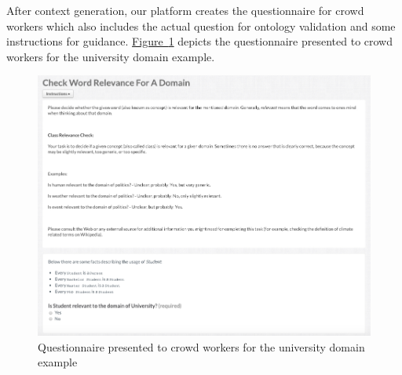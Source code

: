 After context generation, our platform creates the questionnaire for crowd workers which also includes the actual question for ontology validation and some instructions for guidance. 
\hyperref[fig:university_ontology_questionaire]{Figure~\ref*{fig:university_ontology_questionaire}} depicts the questionnaire presented to crowd workers for the university domain example. 
\begin{figure}
	 \centering
	 \includegraphics[width=\textwidth]{screenshots/questionaire_university_example}
	 \caption{Questionnaire presented to crowd workers for the university domain example}\label{fig:university_ontology_questionaire}
\end{figure}

